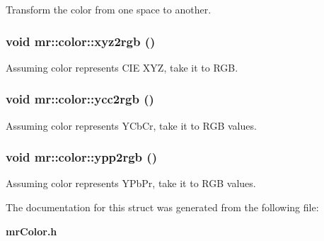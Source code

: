 Transform the color from one space to another. 

\subsubsection{\setlength{\rightskip}{0pt plus 5cm}void mr::color::xyz2rgb ()\hspace{0.3cm}{\tt  [inline]}}\label{structmr_1_1color_z0_0}


Assuming color represents CIE XYZ, take it to RGB. 

\subsubsection{\setlength{\rightskip}{0pt plus 5cm}void mr::color::ycc2rgb ()\hspace{0.3cm}{\tt  [inline]}}\label{structmr_1_1color_z0_6}


Assuming color represents YCb\-Cr, take it to RGB values. 

\subsubsection{\setlength{\rightskip}{0pt plus 5cm}void mr::color::ypp2rgb ()\hspace{0.3cm}{\tt  [inline]}}\label{structmr_1_1color_z0_8}


Assuming color represents YPb\-Pr, take it to RGB values. 



The documentation for this struct was generated from the following file:\begin{CompactItemize}
\item 
{\bf mr\-Color.h}\end{CompactItemize}
